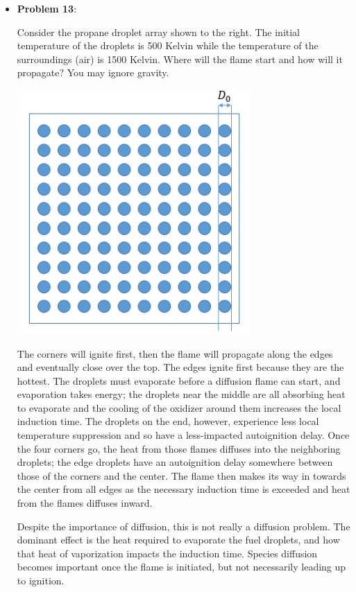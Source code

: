 \documentclass[11pt]{article}
\newcommand{\Item}[1]{\item \textbf{#1}:}
\newcommand{\Problem}[1]{\Item{Problem #1}}
\begin{document}
\begin{itemize}
\Problem{13}\\
\begin{minipage}{0.58\textwidth}
Consider the propane droplet array shown to the right. The initial temperature of the droplets is 500 Kelvin while the temperature of the surroundings (air) is 1500 Kelvin. Where will the flame start and how will it propagate? You may ignore gravity.
\end{minipage}
\begin{minipage}{0.38\textwidth}
\centering\includegraphics[width=0.7\textwidth]{Graphics/droplet_array.png}
\end{minipage}

\vspace{1cm}
The corners will ignite first, then the flame will propagate along the edges and eventually close over the top. The edges ignite first because they are the hottest. The droplets must evaporate before a diffusion flame can start, and evaporation takes energy; the droplets near the middle are all absorbing heat to evaporate and the cooling of the oxidizer around them increases the local induction time. The droplets on the end, however, experience less local temperature suppression and so have a less-impacted autoignition delay. Once the four corners go, the heat from those flames diffuses into the neighboring droplets; the edge droplets have an autoignition delay somewhere between those of the corners and the center. The flame then makes its way in towards the center from all edges as the necessary induction time is exceeded and heat from the flames diffuses inward.

Despite the importance of diffusion, this is not really a diffusion problem. The dominant effect is the heat required to evaporate the fuel droplets, and how that heat of vaporization impacts the induction time. Species diffusion becomes important once the flame is initiated, but not necessarily leading up to ignition.



\end{itemize}
\end{document}
